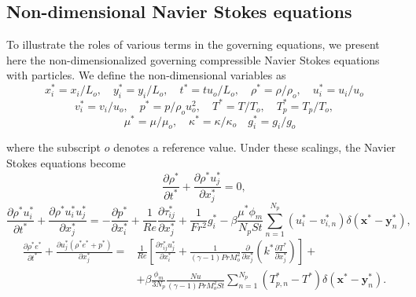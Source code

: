 \documentclass[a4paper,10pt]{report}
\begin{document}
\subsection*{Non-dimensional Navier Stokes equations}

To illustrate the roles of various terms in the governing equations, we present here the non-dimensionalized governing compressible Navier Stokes equations with particles. We define the non-dimensional variables as
\begin{equation}
x_i^*=x_i/L_o, \quad y_i^*=y_i/L_o, \quad t^*=tu_o/L_o, \quad \rho^*=\rho/\rho_o, \quad u_i^*=u_i/u_o	
\end{equation}
\begin{equation}
v_i^*=v_i/u_o, \quad p^*=p/\rho_o u_o^2, \quad T^*=T/T_o, \quad T_p^* = T_p / T_o, 
\end{equation}
\begin{equation}
\quad \mu^* = \mu / \mu_o, \quad \kappa^* = \kappa / \kappa_o \quad g^*_i = g_i / g_o	
\end{equation}

where the subscript $o$ denotes a reference value. Under these scalings, the Navier Stokes equations become
\begin{equation}
\label{eq:NS_cont_nd}
\frac{\partial \rho^*}{\partial t^*} + \frac{\partial \rho^* u_j^*}{\partial x_j^*} = 0,	
\end{equation}
\begin{equation}
\label{eq:NS_mom_nd}
\frac{\partial \rho^* u_i^*}{\partial t^*} + \frac{\partial \rho^* u_i^* u_j^*}{\partial x_j^*} = - \frac{\partial p^*}{\partial x_i^*} + \frac{1}{Re}\frac{\partial \tau_{ij}^*}{\partial x_j^*} + \frac{1}{Fr^2} g_i^* - \beta\frac{\mu^* \phi_m}{N_p St}  \sum_{n=1}^{N_p} (u_i^*-v_{i,n}^*)\delta(\mathbf{x}^* - \mathbf{y}_n^* ),	
\end{equation}
\begin{equation}
\label{eq:NS_en_nd}
\begin{split}
\frac{\partial \rho^* e^*}{\partial t^*} + \frac{\partial u_j^* (\rho^* e^* + p^*)}{\partial x_j^*} = & \frac{1}{Re}\left[\frac{\partial \tau_{ij}^* u_j^*}{\partial x_i^*} + \frac{1}{(\gamma-1)Pr M_o^2}\frac{\partial}{\partial x_j^*}\left( k^* \frac{\partial T^*}{\partial x_j^*}\right)\right]+ \\
& + \beta \frac{\phi_m}{3N_p} \frac{Nu}{(\gamma-1)Pr M_o^2St}\sum_{n=1}^{N_p} (T_{p,n}^* - T^*) \delta(\mathbf{x}^* - \mathbf{y}_n^* ).
\end{split}
\end{equation}
\end{document}
